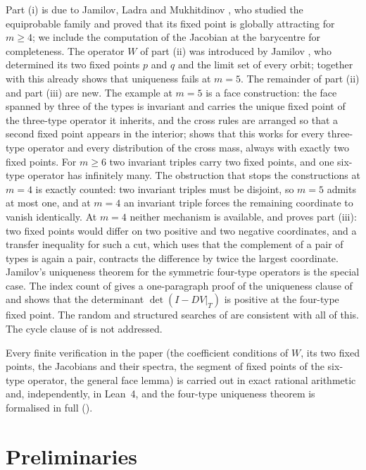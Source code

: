\documentclass[11pt]{amsart}
\theoremstyle{definition}
\begin{document}
Part (i) is due to Jamilov, Ladra and Mukhitdinov \cite{JLM17}, who studied the equiprobable family and proved that its fixed point is globally attracting for $m\ge4$; we include the computation of the Jacobian at the barycentre for completeness. The operator $W$ of part (ii) was introduced by Jamilov \cite{Jam17}, who determined its two fixed points $p$ and $q$ and the limit set of every orbit; together with  this already shows that uniqueness fails at $m=5$. The remainder of part (ii) and part (iii) are new. The example at $m=5$ is a face construction: the face spanned by three of the types is invariant and carries the unique fixed point of the three-type operator it inherits, and the cross rules are arranged so that a second fixed point appears in the interior;  shows that this works for every three-type operator and every distribution of the cross mass, always with exactly two fixed points. For $m\ge6$ two invariant triples carry two fixed points, and one six-type operator has infinitely many. The obstruction that stops the constructions at $m=4$ is exactly counted: two invariant triples must be disjoint, so $m=5$ admits at most one, and at $m=4$ an invariant triple forces the remaining coordinate to vanish identically. At $m=4$ neither mechanism is available, and  proves part (iii): two fixed points would differ on two positive and two negative coordinates, and a transfer inequality for such a cut, which uses that the complement of a pair of types is again a pair, contracts the difference by twice the largest coordinate. Jamilov's uniqueness theorem for the symmetric four-type operators \cite{Jam16} is the special case. The index count of  gives a one-paragraph proof of the uniqueness clause of  and shows that the determinant $\det(I-DV|_T)$ is positive at the four-type fixed point. The random and structured searches of  are consistent with all of this. The cycle clause of  is not addressed.

Every finite verification in the paper (the coefficient conditions of $W$, its two fixed points, the Jacobians and their spectra, the segment of fixed points of the six-type operator, the general face lemma) is carried out in exact rational arithmetic and, independently, in Lean~4, and the four-type uniqueness theorem is formalised in full ().

\section{Preliminaries}\label{sec:prelim}
\end{document}
